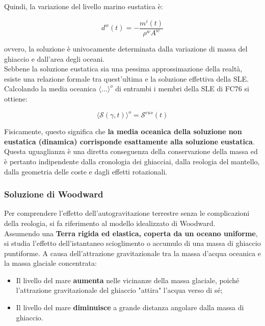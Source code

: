 \documentclass[a4paper,12pt]{book}
\begin{document}
\noindent
Quindi, la variazione del livello marino eustatica è:

\begin{equation}
    d^w(t) = -\frac{m^i(t)}{\rho^w A^w}
\end{equation}

\noindent
ovvero, la soluzione è univocamente determinata dalla variazione di massa del ghiaccio e dall'area degli oceani.\\

\noindent
Sebbene la soluzione eustatica sia una pessima approssimazione della realtà, esiste una relazione formale tra quest'ultima e la soluzione effettiva della SLE.
Calcolando la media oceanica $\langle \dots \rangle^o$ di entrambi i membri della SLE di FC76 si ottiene:

\begin{equation}
    \langle \mathcal{S}(\gamma,t) \rangle^o = \mathcal{S}^{eus}(t)
\end{equation}

\noindent
Fisicamente, questo significa che \textbf{la media oceanica della soluzione non eustatica (dinamica) corrisponde esattamente alla soluzione eustatica}.
Questa uguaglianza è una diretta conseguenza della conservazione della massa ed è pertanto indipendente dalla cronologia dei ghiacciai, dalla reologia del mantello, dalla geometria delle coste e dagli effetti rotazionali.

\subsubsection{\textcolor{colore7}{Soluzione di Woodward}}

Per comprendere l'effetto dell'autogravitazione terrestre senza le complicazioni della reologia,
si fa riferimento al modello idealizzato di Woodward.\\

\noindent
Assumendo una \textbf{Terra rigida ed elastica, coperta da un oceano uniforme}, si studia l'effetto dell'istantaneo scioglimento o accumulo di una massa di ghiaccio puntiforme.
A causa dell'attrazione gravitazionale tra la massa d'acqua oceanica e la massa glaciale concentrata:
\begin{itemize}
    \item Il livello del mare \textbf{aumenta} nelle vicinanze della massa glaciale, poiché l'attrazione gravitazionale del ghiaccio "attira" l'acqua verso di sé;
    \item Il livello del mare \textbf{diminuisce} a grande distanza angolare dalla massa di ghiaccio.
\end{itemize}
\end{document}
